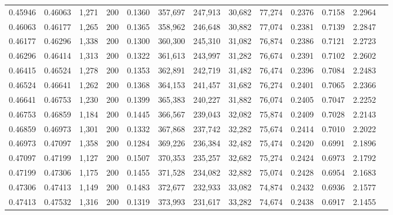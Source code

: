 \begin{tabular}{rrrrrrrrrrrrr}
0.45946 & 0.46063 & 1,271 & 200 &                                     0.1360 & 357,697 & 247,913 &  30,682 &  77,274 & 0.2376 & 0.7158 & 2.2964 \\
0.46063 & 0.46177 & 1,265 & 200 &                                     0.1365 & 358,962 & 246,648 &  30,882 &  77,074 & 0.2381 & 0.7139 & 2.2847 \\
0.46177 & 0.46296 & 1,338 & 200 &                                     0.1300 & 360,300 & 245,310 &  31,082 &  76,874 & 0.2386 & 0.7121 & 2.2723 \\
0.46296 & 0.46414 & 1,313 & 200 &                                     0.1322 & 361,613 & 243,997 &  31,282 &  76,674 & 0.2391 & 0.7102 & 2.2602 \\
0.46415 & 0.46524 & 1,278 & 200 &                                     0.1353 & 362,891 & 242,719 &  31,482 &  76,474 & 0.2396 & 0.7084 & 2.2483 \\
0.46524 & 0.46641 & 1,262 & 200 &                                     0.1368 & 364,153 & 241,457 &  31,682 &  76,274 & 0.2401 & 0.7065 & 2.2366 \\
0.46641 & 0.46753 & 1,230 & 200 &                                     0.1399 & 365,383 & 240,227 &  31,882 &  76,074 & 0.2405 & 0.7047 & 2.2252 \\
0.46753 & 0.46859 & 1,184 & 200 &                                     0.1445 & 366,567 & 239,043 &  32,082 &  75,874 & 0.2409 & 0.7028 & 2.2143 \\
0.46859 & 0.46973 & 1,301 & 200 &                                     0.1332 & 367,868 & 237,742 &  32,282 &  75,674 & 0.2414 & 0.7010 & 2.2022 \\
0.46973 & 0.47097 & 1,358 & 200 &                                     0.1284 & 369,226 & 236,384 &  32,482 &  75,474 & 0.2420 & 0.6991 & 2.1896 \\
0.47097 & 0.47199 & 1,127 & 200 &                                     0.1507 & 370,353 & 235,257 &  32,682 &  75,274 & 0.2424 & 0.6973 & 2.1792 \\
0.47199 & 0.47306 & 1,175 & 200 &                                     0.1455 & 371,528 & 234,082 &  32,882 &  75,074 & 0.2428 & 0.6954 & 2.1683 \\
0.47306 & 0.47413 & 1,149 & 200 &                                     0.1483 & 372,677 & 232,933 &  33,082 &  74,874 & 0.2432 & 0.6936 & 2.1577 \\
0.47413 & 0.47532 & 1,316 & 200 &                                     0.1319 & 373,993 & 231,617 &  33,282 &  74,674 & 0.2438 & 0.6917 & 2.1455 \\

\end{tabular}
